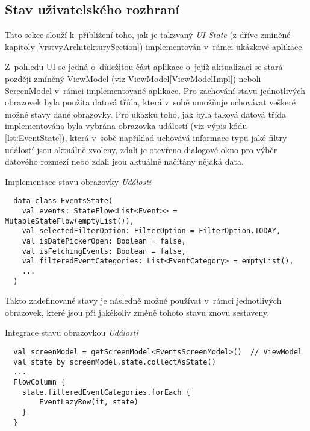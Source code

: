 
\subsection{Stav uživatelského rozhraní} \label{stateHandlingImpl}
Tato sekce slouží k~přiblížení toho, jak je takzvaný \textit{UI State} (z dříve zmíněné kapitoly \ref{vrstvyArchitekturySection}) 
implementován v~rámci ukázkové aplikace.

Z~pohledu UI se jedná o~důležitou část aplikace o~jejíž aktualizaci se stará později zmíněný ViewModel (viz ViewModel\ref{ViewModelImpl}) neboli ScreenModel v~rámci
implementované aplikace. 
Pro zachování stavu jednotlivých obrazovek byla použita datová třída, která v~sobě umožňuje uchovávat veškeré možné stavy dané obrazovky.
Pro ukázku toho, jak byla taková datová třída implementována byla vybrána obrazovka událostí (viz výpis kódu \ref{lst:EventState}), která v~sobě 
například uchovává informace typu jaké filtry událostí jsou aktuálně zvoleny, zdali je otevřeno dialogové okno pro výběr datového rozmezí 
nebo zdali jsou aktuálně načítány nějaká data.
\begin{listing}[H]
\caption{Implementace stavu obrazovky \textit{Události}}\label{lst:EventState}
\begin{verbatim}
  data class EventsState(
    val events: StateFlow<List<Event>> = MutableStateFlow(emptyList()),
    val selectedFilterOption: FilterOption = FilterOption.TODAY,
    val isDatePickerOpen: Boolean = false,
    val isFetchingEvents: Boolean = false,
    val filteredEventCategories: List<EventCategory> = emptyList(),
    ...
  )
\end{verbatim}
\end{listing}

Takto zadefinované stavy je následně možné používat v~rámci jednotlivých obrazovek, které jsou při jakékoliv změně tohoto stavu znovu sestaveny.


\begin{listing}[H]
\caption{Integrace stavu obrazovkou \textit{Události}}\label{lst:StateImpl}
\begin{verbatim}
  val screenModel = getScreenModel<EventsScreenModel>()  // ViewModel
  val state by screenModel.state.collectAsState()
  ...
  FlowColumn {
    state.filteredEventCategories.forEach {
        EventLazyRow(it, state)
    }
  }
\end{verbatim}
\end{listing}

